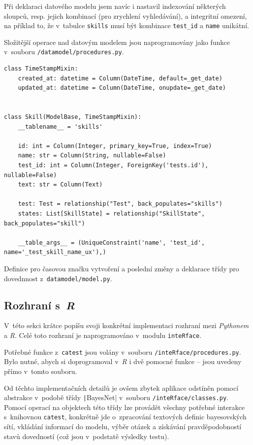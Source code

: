 \documentclass[a4paper,twoside,12pt]{scrbook}
\begin{document}
Při deklaraci datového modelu jsem navíc i nastavil indexování některých sloupců, resp. jejich kombinací (pro zrychlení vyhledávání), a integritní omezení, na příklad to, že v~tabulce \texttt{skills} musí být kombinace \texttt{test\_id} a \texttt{name} unikátní.

Složitější operace nad datovým modelem jsou naprogramovány jako funkce v~souboru \texttt{/datamodel/procedures.py}.

\begin{listing}
\centering
\begin{verbatim}
class TimeStampMixin:
    created_at: datetime = Column(DateTime, default=_get_date)
    updated_at: datetime = Column(DateTime, onupdate=_get_date)


class Skill(ModelBase, TimeStampMixin):
    __tablename__ = 'skills'

    id: int = Column(Integer, primary_key=True, index=True)
    name: str = Column(String, nullable=False)
    test_id: int = Column(Integer, ForeignKey('tests.id'), nullable=False)
    text: str = Column(Text)

    test: Test = relationship("Test", back_populates="skills")
    states: List[SkillState] = relationship("SkillState", back_populates="skill")

    __table_args__ = (UniqueConstraint('name', 'test_id', name='_test_skill_name_ux'),)
\end{verbatim}
\caption{Definice  pro časovou značku vytvoření a poslední změny a deklarace třídy pro dovednnost z~\texttt{datamodel/model.py}.}
\label{lst:SkillDeclaration}
\end{listing}

\subsection{Rozhraní s~\textit{R}}
V~této sekci krátce popíšu svoji konkrétní implementaci rozhraní mezi \textit{Pythonem} a \textit{R}. Celé toto rozhraní je naprogramováno v~modulu \texttt{inteRface}.

Potřebné funkce z~\texttt{catest} jsou volány v~souboru \texttt{/inteRface/procedures.py}. Bylo nutné, abych si doprogramoval v~\textit{R} i dvě pomocné funkce -- jsou uvedeny přímo v~tomto souboru.

Od těchto implementačních detailů je ovšem zbytek aplikace odstíněn pomocí abstrakce v~podobě třídy \texttt|BayesNet| v~souboru \texttt{/inteRface/classes.py}. Pomocí operací na objektech této třídy lze provádět všechny potřebné interakce s~knihovnou \texttt{catest}, konkrétně jde o~zpracování textových definic bayesovských sítí, vkládání informací do modelu, výběr otázek a získávání pravděpodobností stavů dovedností (což jsou v~podstatě výsledky testu).
\end{document}
